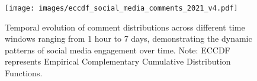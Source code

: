 
\begin{figure}[t]
    \centering
    \newcommand\myheight{0.135}
    {
        \texttt{[image: images/eccdf\_social\_media\_comments\_2021\_v4.pdf]}
        \label{fig:data_insights_comments}
    }%
    \caption{ Temporal evolution of comment distributions across different time windows ranging from 1 hour to 7 days, demonstrating the dynamic patterns of social media engagement over time. Note: ECCDF represents Empirical Complementary Cumulative Distribution Functions.}
    \label{fig:data_insights}
\end{figure}
